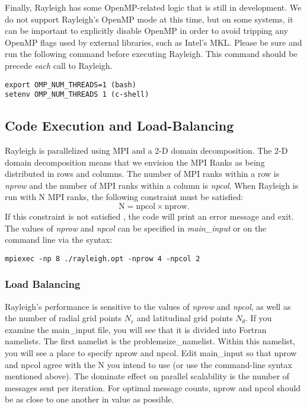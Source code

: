 Finally, Rayleigh has some OpenMP-related logic that is still in development.  We do not support Rayleigh's OpenMP mode at this time, but on some systems, it can be important to explicitly disable OpenMP in order to avoid tripping any OpenMP flags used by external libraries, such as Intel's MKL.  Please be sure and run the following command before executing Rayleigh.  This command should be precede \textit{each} call to Rayleigh.
\begin{lstlisting}
export OMP_NUM_THREADS=1 (bash)
setenv OMP_NUM_THREADS 1 (c-shell)
\end{lstlisting}


\subsection{Code Execution and Load-Balancing}
Rayleigh is parallelized using MPI and a 2-D domain decomposition. The 2-D domain decomposition means that we envision the MPI Ranks as being distributed in rows and columns.  The number of MPI ranks within a row is \textit{nprow} and the number of MPI ranks within a column is \textit{npcol}.  When Rayleigh is run with N MPI ranks, the following constraint must be satisfied:
\begin{equation}
\mathrm{N} = \mathrm{npcol} \times \mathrm{nprow}   .
\end{equation}
If this constraint is not satisfied , the code will print an error message and exit.  The values of \textit{nprow} and \textit{npcol} can be specified in \textit{main\_input} or on the command line via the syntax:
\begin{lstlisting}
mpiexec -np 8 ./rayleigh.opt -nprow 4 -npcol 2
\end{lstlisting}

\subsubsection{Load Balancing}
Rayleigh's performance is sensitive to the values of \textit{nprow} and \textit{npcol}, as well as the number of radial grid points $N_r$ and latitudinal grid points $N_\theta$.   If you examine the main\_input file,  you will see that it is divided into Fortran namelists.  The first namelist is the problemsize\_namelist.  Within this namelist, you will see a place to specify nprow and npcol.  Edit main\_input so that nprow and npcol agree with the N you intend to use (or use the command-line syntax mentioned above).  The dominate effect on parallel scalability is the number of messages sent per iteration.  For optimal message counts, nprow and npcol should be as close to one another in value as possible.

